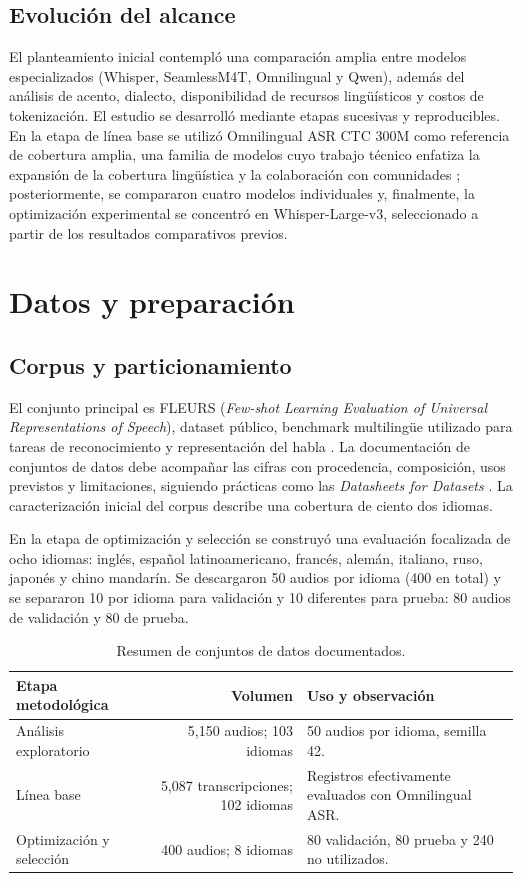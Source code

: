 \documentclass[11pt,letterpaper]{article}
\begin{document}
\subsection{Evolución del alcance}
El planteamiento inicial contempló una comparación amplia entre modelos especializados (Whisper, SeamlessM4T, Omnilingual y Qwen), además del análisis de acento, dialecto, disponibilidad de recursos lingüísticos y costos de tokenización. El estudio se desarrolló mediante etapas sucesivas y reproducibles. En la etapa de línea base se utilizó Omnilingual ASR CTC 300M como referencia de cobertura amplia, una familia de modelos cuyo trabajo técnico enfatiza la expansión de la cobertura lingüística y la colaboración con comunidades \cite{omnilingual2025}; posteriormente, se compararon cuatro modelos individuales y, finalmente, la optimización experimental se concentró en Whisper-Large-v3, seleccionado a partir de los resultados comparativos previos.

\section{Datos y preparación}
\subsection{Corpus y particionamiento}
El conjunto principal es FLEURS (\textit{Few-shot Learning Evaluation of Universal Representations of Speech}), dataset público, benchmark multilingüe utilizado para tareas de reconocimiento y representación del habla \cite{conneau2023}. La documentación de conjuntos de datos debe acompañar las cifras con procedencia, composición, usos previstos y limitaciones, siguiendo prácticas como las \textit{Datasheets for Datasets} \cite{gebru2021}. La caracterización inicial del corpus describe una cobertura de ciento dos idiomas.

En la etapa de optimización y selección se construyó una evaluación focalizada de ocho idiomas: inglés, español latinoamericano, francés, alemán, italiano, ruso, japonés y chino mandarín. Se descargaron 50 audios por idioma (400 en total) y se separaron 10 por idioma para validación y 10 diferentes para prueba: 80 audios de validación y 80 de prueba.

\begin{table}[H]\centering
\caption{Resumen de conjuntos de datos documentados.}
\begin{tabularx}{\textwidth}{l r X}\toprule
\textbf{Etapa metodológica} & \textbf{Volumen} & \textbf{Uso y observación}\\\midrule
Análisis exploratorio & 5,150 audios; 103 idiomas & 50 audios por idioma, semilla 42.\\
Línea base & 5,087 transcripciones; 102 idiomas & Registros efectivamente evaluados con Omnilingual ASR.\\
Optimización y selección & 400 audios; 8 idiomas & 80 validación, 80 prueba y 240 no utilizados.\\\bottomrule
\end{tabularx}\end{table}
\end{document}
